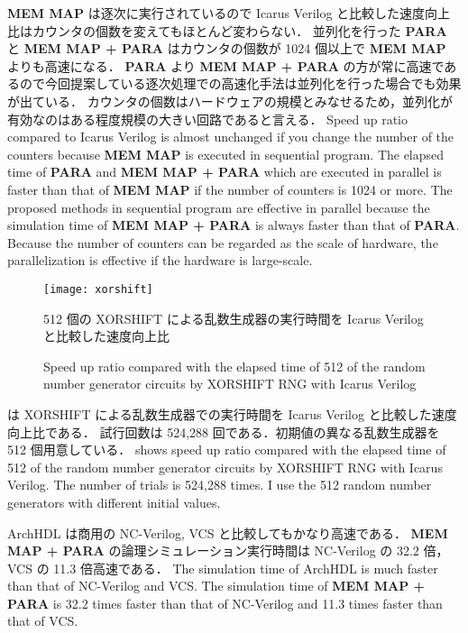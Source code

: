 \textbf{MEM MAP} は逐次に実行されているので Icarus Verilog と比較した速度向上比はカウンタの個数を変えてもほとんど変わらない．
並列化を行った \textbf{PARA} と \textbf{MEM MAP + PARA} はカウンタの個数が 1024 個以上で \textbf{MEM MAP} よりも高速になる．
\textbf{PARA} より \textbf{MEM MAP + PARA} の方が常に高速であるので今回提案している逐次処理での高速化手法は並列化を行った場合でも効果が出ている．
カウンタの個数はハードウェアの規模とみなせるため，並列化が有効なのはある程度規模の大きい回路であると言える．
\fi
Speed up ratio compared to Icarus Verilog is almost unchanged if you change the number of the counters because \textbf{MEM MAP} is executed in sequential program.
The elapsed time of \textbf{PARA} and \textbf{MEM MAP + PARA} which are executed in parallel is faster than that of \textbf{MEM MAP} if the number of counters is 1024 or more.
The proposed methods in sequential program are effective in parallel
because the simulation time of \textbf{MEM MAP + PARA} is always faster than that of \textbf{PARA}.
Because the number of counters can be regarded as the scale of hardware, the parallelization is effective if the hardware is large-scale.


\begin{figure}[tb]
 \centering
 \texttt{[image: xorshift]}
 \caption{512 個の XORSHIFT による乱数生成器の実行時間を Icarus Verilog と比較した速度向上比}
\fi
 \caption{Speed up ratio compared with the elapsed time of 512 of the random number generator circuits by XORSHIFT RNG with Icarus Verilog}
 \label{fig:xorshift}
\end{figure}

 は XORSHIFT による乱数生成器での実行時間を Icarus Verilog と比較した速度向上比である．
試行回数は 524,288 回である．初期値の異なる乱数生成器を 512 個用意している．
\fi
{} shows speed up ratio compared with the elapsed time of 512 of the random number generator circuits by XORSHIFT RNG with Icarus Verilog.
The number of trials is 524,288 times.
I use the 512 random number generators with different initial values.

ArchHDL は商用の NC-Verilog, VCS と比較してもかなり高速である．
\textbf{MEM MAP + PARA} の論理シミュレーション実行時間は NC-Verilog の 32.2 倍，VCS の 11.3 倍高速である．
\fi
The simulation time of ArchHDL is much faster than that of NC-Verilog and VCS.
The simulation time of \textbf{MEM MAP + PARA} is 32.2 times faster than that of NC-Verilog and 11.3 times faster than that of VCS.

